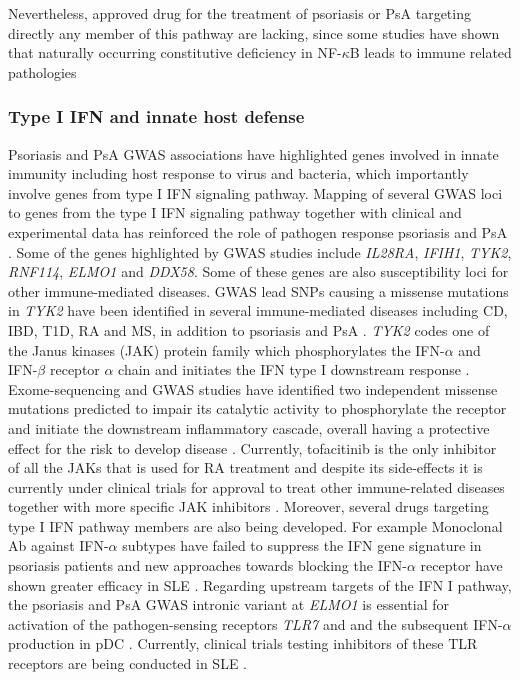 Nevertheless, approved drug for the treatment of psoriasis or PsA targeting directly any member of this pathway are lacking, since some studies have shown that naturally occurring constitutive deficiency in NF-$\kappa$B leads to immune related pathologies \parencite{Orange2005,Puel2004}


\subsubsection*{Type I IFN and innate host defense}
Psoriasis and PsA GWAS associations have highlighted genes involved in innate immunity including host response to virus and bacteria, which importantly involve genes from type I IFN signaling pathway. Mapping of several GWAS loci to genes from the type I IFN signaling pathway together with clinical and experimental data has reinforced the role of pathogen response psoriasis and PsA \parencite{Nextle2005}. Some of the genes highlighted by GWAS studies include \textit{IL28RA}, \textit{IFIH1}, \textit{TYK2}, \textit{RNF114}, \textit{ELMO1} and \textit{DDX58}. Some of these genes are also susceptibility loci for other immune-mediated diseases. GWAS lead SNPs causing a missense mutations in \textit{TYK2} have been identified in several immune-mediated diseases including CD, IBD, T1D, RA and MS, in addition to psoriasis and PsA \parencite{ImmunoBase}. \textit{TYK2} codes one of the Janus kinases (JAK) protein family which phosphorylates the IFN-$\alpha$ and IFN-$\beta$ receptor $\alpha$ chain and initiates the IFN type I downstream response \parencite{Calamonici1994}. Exome-sequencing and GWAS studies have identified two independent missense mutations predicted to impair its catalytic activity to phosphorylate the receptor and initiate the downstream inflammatory cascade, overall having a protective effect for the risk to develop disease \parencite{Strange2010, Tsoi2012, Dand2017}. Currently, tofacitinib is the only inhibitor of all the JAKs that is used for RA treatment \parencite{van Vollenhoven2012} and despite its side-effects it is currently under clinical trials for approval to treat other immune-related diseases together with more specific JAK inhibitors \parencite{Baker2017}. Moreover, several drugs targeting type I IFN pathway members are also being developed. For example Monoclonal Ab against IFN-$\alpha$ subtypes have failed to suppress the IFN gene signature in psoriasis patients and new approaches towards blocking the IFN-$\alpha$ receptor have shown greater efficacy in SLE \parencite{Furie2017}. Regarding upstream targets of the IFN I pathway, the psoriasis and PsA GWAS intronic variant at \textit{ELMO1} is essential for activation of the pathogen-sensing receptors \textit{TLR7} and \parencite{TLR9} and the subsequent IFN-$\alpha$ production in pDC \parencite{Tsoi2012}. Currently, clinical trials testing inhibitors of these TLR receptors are being conducted in SLE \parencite{Baker2017}.


